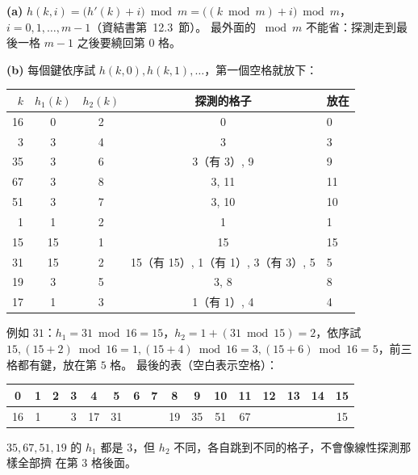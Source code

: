 \begin{pastsoln}
\textbf{(a)} $h(k, i) = \bigl(h'(k) + i\bigr) \bmod m = \bigl((k \bmod m) + i\bigr) \bmod m$，
$i = 0, 1, \ldots, m - 1$（資結書第~12.3~節）。 最外面的 $\bmod m$ 不能省：探測走到最後一格
$m - 1$ 之後要繞回第 $0$ 格。

\textbf{(b)} 每個鍵依序試 $h(k, 0), h(k, 1), \ldots$，第一個空格就放下：
\begin{center}
\small
\begin{tabular}{rcccl}
\toprule
$k$ & $h_1(k)$ & $h_2(k)$ & 探測的格子 & 放在 \\
\midrule
16 & 0 & 2 & 0 & 0 \\
3 & 3 & 4 & 3 & 3 \\
35 & 3 & 6 & 3（有 3）, 9 & 9 \\
67 & 3 & 8 & 3, 11 & 11 \\
51 & 3 & 7 & 3, 10 & 10 \\
1 & 1 & 2 & 1 & 1 \\
15 & 15 & 1 & 15 & 15 \\
31 & 15 & 2 & 15（有 15）, 1（有 1）, 3（有 3）, 5 & 5 \\
19 & 3 & 5 & 3, 8 & 8 \\
17 & 1 & 3 & 1（有 1）, 4 & 4 \\
\bottomrule
\end{tabular}
\end{center}
例如 $31$：$h_1 = 31 \bmod 16 = 15$，$h_2 = 1 + (31 \bmod 15) = 2$，依序試
$15, (15 + 2) \bmod 16 = 1, (15 + 4) \bmod 16 = 3, (15 + 6) \bmod 16 = 5$，前三格都有鍵，放在第
$5$ 格。 最後的表（空白表示空格）：
\begin{center}
\small
\setlength{\tabcolsep}{4pt}
\begin{tabular}{|*{16}{c|}}
\hline
0 & 1 & 2 & 3 & 4 & 5 & 6 & 7 & 8 & 9 & 10 & 11 & 12 & 13 & 14 & 15 \\ \hline
16 & 1 &  & 3 & 17 & 31 &  &  & 19 & 35 & 51 & 67 &  &  &  & 15 \\ \hline
\end{tabular}
\end{center}
$35, 67, 51, 19$ 的 $h_1$ 都是 $3$，但 $h_2$ 不同，各自跳到不同的格子，不會像線性探測那樣全部擠
在第 $3$ 格後面。


\end{pastsoln}
